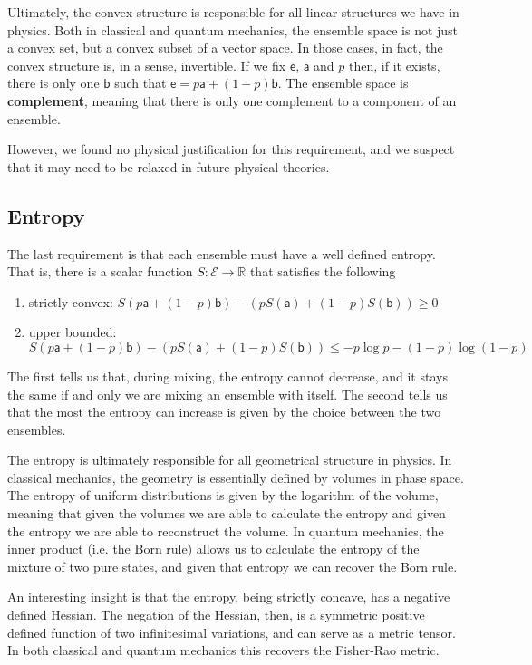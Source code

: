 \documentclass[10pt,twocolumn, nofootinbib]{revtex4-2}
\newcommand{\ens}[1][e] {\mathsf{#1}} %
\newcommand{\Ens}[1][E] {\mathcal{#1}} %
\begin{document}
Ultimately, the convex structure is responsible for all linear structures we have in physics. Both in classical and quantum mechanics, the ensemble space is not just a convex set, but a convex subset of a vector space. In those cases, in fact, the convex structure is, in a sense, invertible. If we fix $\ens$, $\ens[a]$ and $p$ then, if it exists, there is only one $\ens[b]$ such that $\ens = p \ens[a] + (1-p) \ens[b]$. The ensemble space is \textbf{complement}, meaning that there is only one complement to a component of an ensemble.

However, we found no physical justification for this requirement, and we suspect that it may need to be relaxed in future physical theories.

\subsection{Entropy}
The last requirement is that each ensemble must have a well defined entropy. That is, there is a scalar function $S : \Ens \to \mathbb{R}$ that satisfies the following
\begin{enumerate}
	\item strictly convex: $S(p \ens[a] + (1-p) \ens[b]) - (p S(\ens[a]) + (1-p) S(\ens[b]) ) \geq 0$
	\item upper bounded: $S(p \ens[a] + (1-p) \ens[b]) - (p S(\ens[a]) + (1-p) S(\ens[b]) ) \leq - p \log p - (1-p) \log(1-p)$
\end{enumerate}
The first tells us that, during mixing, the entropy cannot decrease, and it stays the same if and only we are mixing an ensemble with itself. The second tells us that the most the entropy can increase is given by the choice between the two ensembles.

The entropy is ultimately responsible for all geometrical structure in physics. In classical mechanics, the geometry is essentially defined by volumes in phase space. The entropy of uniform distributions is given by the logarithm of the volume, meaning that given the volumes we are able to calculate the entropy and given the entropy we are able to reconstruct the volume. In quantum mechanics, the inner product (i.e. the Born rule) allows us to calculate the entropy of the mixture of two pure states, and given that entropy we can recover the Born rule.

An interesting insight is that the entropy, being strictly concave, has a negative defined Hessian. The negation of the Hessian, then, is a symmetric positive defined function of two infinitesimal variations, and can serve as a metric tensor. In both classical and quantum mechanics this recovers the Fisher-Rao metric.
\end{document}
